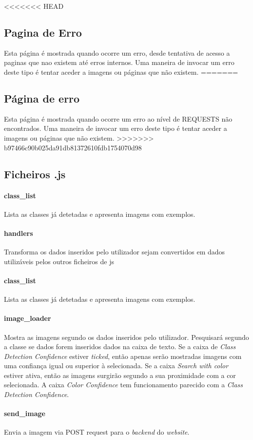 \documentclass{report}
\begin{document}
<<<<<<< HEAD
\subsection{Pagina de Erro}
Esta página é mostrada quando ocorre um erro, desde tentativa de acesso a paginas que nao existem até erros internos.
Uma maneira de invocar um erro deste tipo é tentar aceder a imagens ou páginas que não existem. 
=======
\subsection{Página de erro}
Esta página é mostrada quando ocorre um erro ao nível de REQUESTS não encontrados. Uma maneira de invocar um erro deste tipo é tentar aceder a imagens ou páginas que não existem. 
>>>>>>> b97466c90b025da91db81372610fdb1754070d98

\subsection{Ficheiros .js}
\paragraph{class\_list}  Lista as classes já detetadas e apresenta imagens com exemplos.
\paragraph{handlers} Transforma os dados inseridos pelo utilizador sejam convertidos em dados utilizáveis pelos outros ficheiros de \ac{js}
\paragraph{class\_list}  Lista as classes já detetadas e apresenta imagens com exemplos.
\paragraph{image\_loader}Mostra as imagens segundo os dados inseridos pelo utilizador. 
Pesquisará segundo a classe se dados forem inseridos dados na caixa de texto. 
Se a caixa de \textit{Class Detection Confidence} estiver \textit{ticked}, então 
apenas serão mostradas imagens com uma confiança igual ou superior à selecionada. 
Se a caixa \textit{Search with color} estiver ativa, então as imagens surgirão segundo a 
sua proximidade com a cor selecionada. A caixa \textit{Color Confidence} tem funcionamento 
parecido com a \textit{Class Detection Confidence}. 
\paragraph{send\_image} Envia a imagem via POST request para o \textit{backend} do \textit{website}.
\end{document}
